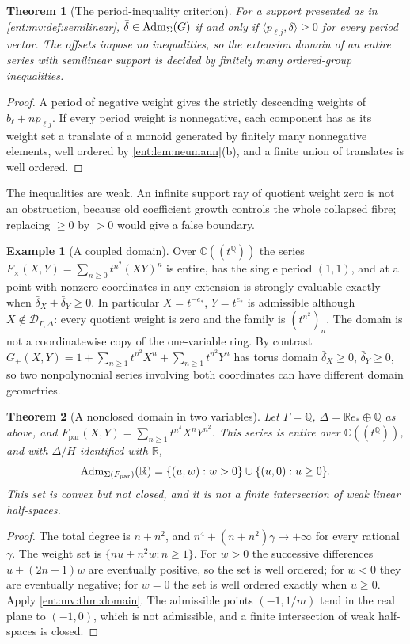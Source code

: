 \documentclass[11pt]{article}
\newtheorem{theorem}{Theorem}[section]
\theoremstyle{plain}
\theoremstyle{plain}
\theoremstyle{plain}
\theoremstyle{definition}
\theoremstyle{definition}
\theoremstyle{definition}
\newtheorem{example}[example]{Example}
\theoremstyle{definition}
\theoremstyle{remark}
\newcommand{\C}{\mathbb C}\newcommand{\R}{\mathbb R}
\newcommand{\Q}{\mathbb Q}\newcommand{\Z}{\mathbb Z}\newcommand{\N}{\mathbb N}
\newcommand{\Dom}{\mathcal D_{\Gamma,\Delta}}
\newcommand{\inner}[2]{\langle#1,#2\rangle}
\begin{document}
\begin{theorem}[The period-inequality criterion]\label{ent:mv:thm:semilinear}
For a support presented as in \cref{ent:mv:def:semilinear},
$\bar\delta\in\operatorname{Adm}_\Sigma(G)$ if and only if $\inner{p_{\ell j}}{\bar\delta}
\ge0$ for every period vector. The offsets impose no inequalities, so the
extension domain of an entire series with semilinear support is decided by
finitely many ordered-group inequalities.
\end{theorem}
\begin{proof}
A period of negative weight gives the strictly descending weights of
$b_\ell+np_{\ell j}$. If every period weight is nonnegative, each component
has as its weight set a translate of a monoid generated by finitely many
nonnegative elements, well ordered by \cref{ent:lem:neumann}(b), and a finite
union of translates is well ordered.
\end{proof}

The inequalities are weak. An infinite support ray of quotient weight zero is
not an obstruction, because old coefficient growth controls the whole
collapsed fibre; replacing $\ge0$ by $>0$ would give a false boundary.

\begin{example}[A coupled domain]\label{ent:mv:ex:product}
Over $\C((t^\Q))$ the series $F_\times(X,Y)=\sum_{n\ge0}t^{n^2}(XY)^n$ is
entire, has the single period $(1,1)$, and at a point with nonzero
coordinates in any extension is strongly evaluable exactly when
$\bar\delta_X+\bar\delta_Y\ge0$. In particular $X=t^{-e_*}$, $Y=t^{e_*}$ is
admissible although $X\notin\Dom$: every quotient weight is zero and the
family is $(t^{n^2})_n$. The domain is not a coordinatewise copy of the
one-variable ring. By contrast
$G_+(X,Y)=1+\sum_{n\ge1}t^{n^2}X^n+\sum_{n\ge1}t^{n^2}Y^n$ has torus domain
$\bar\delta_X\ge0$, $\bar\delta_Y\ge0$, so two nonpolynomial series involving
both coordinates can have different domain geometries.
\end{example}

\begin{theorem}[A nonclosed domain in two variables]\label{ent:mv:thm:nonclosed}
Let $\Gamma=\Q$, $\Delta=\R e_*\oplus\Q$ as above, and
$F_{\mathrm{par}}(X,Y)=\sum_{n\ge1}t^{n^4}X^nY^{n^2}$. This series is entire
over $\C((t^\Q))$, and with $\Delta/H$ identified with $\R$,
\[
 \Adm_{\Sigma(F_{\mathrm{par}})}(\R)=\{(u,w):w>0\}\cup\{(u,0):u\ge0\}.
\]
This set is convex but not closed, and it is not a finite intersection of
weak linear half-spaces.
\end{theorem}
\begin{proof}
The total degree is $n+n^2$, and $n^4+(n+n^2)\gamma\to+\infty$ for every
rational $\gamma$. The weight set is $\{nu+n^2w:n\ge1\}$. For $w>0$ the
successive differences $u+(2n+1)w$ are eventually positive, so the set is
well ordered; for $w<0$ they are eventually negative; for $w=0$ the set is
well ordered exactly when $u\ge0$. Apply \cref{ent:mv:thm:domain}. The
admissible points $(-1,1/m)$ tend in the real plane to $(-1,0)$, which is not
admissible, and a finite intersection of weak half-spaces is closed.
\end{proof}
\end{document}
